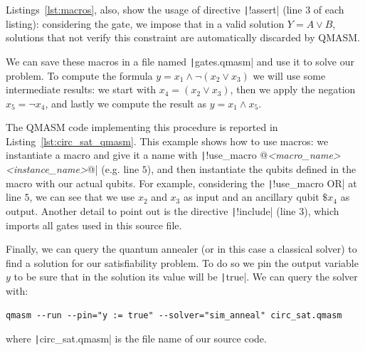 Listings~\ref{lst:macros}, also, show the usage of directive \texttt|!assert| (line $3$ of each listing): considering the  gate, we impose that in a valid solution $Y = A \lor B$, solutions that not verify this constraint are automatically discarded by QMASM.

We can save these macros in a file named \texttt|gates.qmasm| and use it to solve our problem. To compute the formula $y = x_1 \land \neg(x_2 \lor x_3)$ we will use some intermediate results: we start with $x_4 = (x_2 \lor x_3)$, then we apply the negation $x_5 = \neg x_4$, and lastly we compute the result as $y = x_1 \land x_5$. 

\begin{listingenv}[h]
	\caption{Circuit satisfiability}
	\label{lst:circ_sat_qmasm}
\end{listingenv}

The QMASM code implementing this procedure is reported in Listing~\ref{lst:circ_sat_qmasm}. This example shows how to use macros: we instantiate a macro and give it a name with \texttt|!use_macro @\textit{<macro\_name> <instance\_name>}@| (e.g. line $5$), and then instantiate the qubits defined in the macro with our actual qubits. For example, considering the \texttt|!use_macro OR| at line $5$, we can see that we use $x_2$ and $x_3$ as input and an ancillary qubit $\$x_4$ as output. Another detail to point out is the directive \texttt|!include| (line $3$), which imports all gates used in this source file.

Finally, we can query the quantum annealer (or in this case a classical solver) to find a solution for our satisfiability problem. To do so we pin the output variable $y$ to be sure that in the solution its value will be \texttt|true|. We can query the solver with:

\begin{center}
	\vspace{-.1cm}
	\begin{minipage}{.95\linewidth}
		\begin{verbatim}
qmasm --run --pin="y := true" --solver="sim_anneal" circ_sat.qmasm
		\end{verbatim}
	\end{minipage}
\end{center}
where \texttt|circ_sat.qmasm| is the file name of our source code. 

